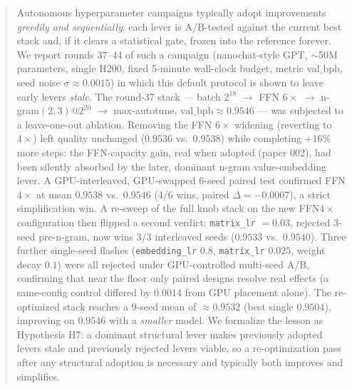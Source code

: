 \documentclass{article}
\newcommand{\valbpb}{\mathrm{val\_bpb}}
\begin{document}

\printAffiliationsAndNotice{}

\begin{abstract}
Autonomous hyperparameter campaigns typically adopt improvements \emph{greedily and sequentially}: each lever is A/B-tested against the current best stack and, if it clears a statistical gate, frozen into the reference forever. We report rounds 37--44 of such a campaign (nanochat-style GPT, $\sim$50M parameters, single H200, fixed 5-minute wall-clock budget, metric $\valbpb$, seed noise $\sigma \approx 0.0015$) in which this default protocol is shown to leave early levers \emph{stale}. The round-37 stack --- batch $2^{18}$ $\rightarrow$ FFN $6\times$ $\rightarrow$ n-gram$(2,3)$@$2^{20}$ $\rightarrow$ max-autotune, $\valbpb \approx 0.9546$ --- was subjected to a leave-one-out ablation. Removing the FFN $6\times$ widening (reverting to $4\times$) left quality unchanged ($0.9536$ vs.\ $0.9538$) while completing $+16\%$ more steps: the FFN-capacity gain, real when adopted (paper 002), had been silently absorbed by the later, dominant n-gram value-embedding lever. A GPU-interleaved, GPU-swapped 6-seed paired test confirmed FFN $4\times$ at mean $0.9538$ vs.\ $0.9546$ (4/6 wins, paired $\Delta = -0.0007$), a strict simplification win. A re-sweep of the full knob stack on the new FFN$4\times$ configuration then flipped a second verdict: \texttt{matrix\_lr} $= 0.03$, rejected 3-seed pre-n-gram, now wins 3/3 interleaved seeds ($0.9533$ vs.\ $0.9540$). Three further single-seed flashes (\texttt{embedding\_lr} $0.8$, \texttt{matrix\_lr} $0.025$, weight decay $0.1$) were all rejected under GPU-controlled multi-seed A/B, confirming that near the floor only paired designs resolve real effects (a same-config control differed by $0.0014$ from GPU placement alone). The re-optimized stack reaches a 9-seed mean of $\approx 0.9532$ (best single $0.9504$), improving on $0.9546$ with a \emph{smaller} model. We formalize the lesson as Hypothesis H7: a dominant structural lever makes previously adopted levers stale and previously rejected levers viable, so a re-optimization pass after any structural adoption is necessary and typically both improves and simplifies.
\end{abstract}
\end{document}
